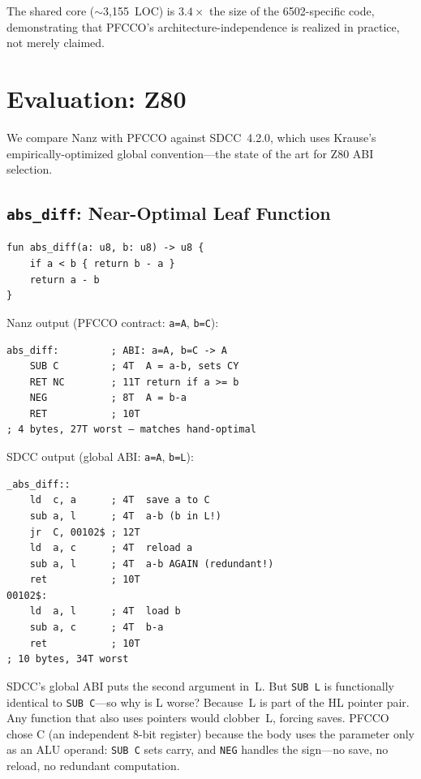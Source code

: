 \documentclass[sigplan,screen,nonacm]{acmart}
\begin{document}
\noindent The shared core ($\sim$3{,}155~LOC) is $3.4\times$ the size of
the 6502-specific code, demonstrating that PFCCO's
architecture-independence is realized in practice, not merely claimed.

\section{Evaluation: Z80}
\label{sec:eval}

We compare Nanz with PFCCO against SDCC~4.2.0, which uses
Krause's~\cite{krause2022} empirically-optimized global convention---the
state of the art for Z80 ABI selection.

\subsection{\texttt{abs\_diff}: Near-Optimal Leaf Function}

\begin{lstlisting}[language=nanz,caption={\texttt{abs\_diff} in Nanz.}]
fun abs_diff(a: u8, b: u8) -> u8 {
    if a < b { return b - a }
    return a - b
}
\end{lstlisting}

\noindent Nanz output (PFCCO contract: \texttt{a=A}, \texttt{b=C}):
\begin{lstlisting}[language=z80asm]
abs_diff:         ; ABI: a=A, b=C -> A
    SUB C         ; 4T  A = a-b, sets CY
    RET NC        ; 11T return if a >= b
    NEG           ; 8T  A = b-a
    RET           ; 10T
; 4 bytes, 27T worst — matches hand-optimal
\end{lstlisting}

\noindent SDCC output (global ABI: \texttt{a=A}, \texttt{b=L}):
\begin{lstlisting}[language=z80asm]
_abs_diff::
    ld  c, a      ; 4T  save a to C
    sub a, l      ; 4T  a-b (b in L!)
    jr  C, 00102$ ; 12T
    ld  a, c      ; 4T  reload a
    sub a, l      ; 4T  a-b AGAIN (redundant!)
    ret           ; 10T
00102$:
    ld  a, l      ; 4T  load b
    sub a, c      ; 4T  b-a
    ret           ; 10T
; 10 bytes, 34T worst
\end{lstlisting}

SDCC's global ABI puts the second argument in~L.  But \texttt{SUB~L} is
functionally identical to \texttt{SUB~C}---so why is L worse?  Because~L is
part of the HL pointer pair.  Any function that also uses pointers would
clobber~L, forcing saves.  PFCCO chose C (an independent 8-bit register)
because the body uses the parameter only as an ALU operand: \texttt{SUB~C}
sets carry, and \texttt{NEG} handles the sign---no save, no reload, no
redundant computation.
\end{document}
